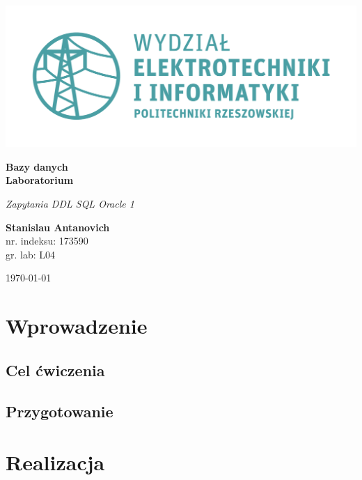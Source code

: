 \documentclass{article}
\begin{document}
\begin{titlepage}
\begin{center}
	\includegraphics[scale=0.7]{logo.png}

	\vspace*{4cm}
	\textbf{Bazy danych\\ Laboratorium}

	\vspace{1.5cm}
	\textit{Zapytania DDL SQL Oracle 1}

	\vspace{1.5cm}
	\textbf{Stanislau Antanovich}\\
	nr. indeksu: 173590\\
	gr. lab: L04

	\vspace{4.5cm}
	\today
\end{center}
\end{titlepage}

\tableofcontents
\listoffigures
\lstlistoflistings

\newpage
 
\section{Wprowadzenie}

\subsection{Cel ćwiczenia}

\blindtext
\subsection{Przygotowanie}

\blindtext

\section{Realizacja}
\end{document}
